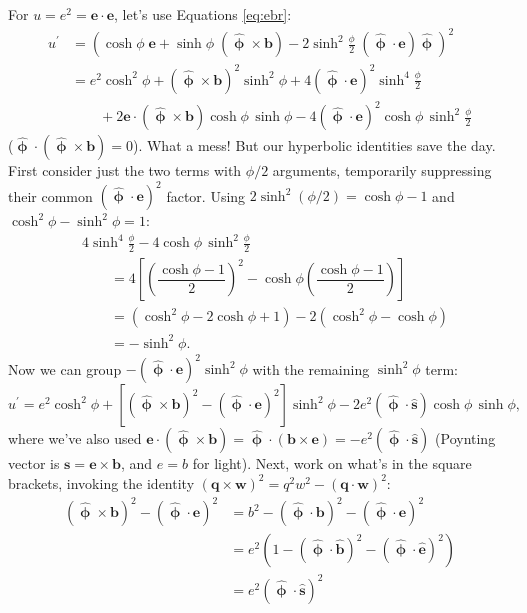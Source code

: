 \documentclass[12pt]{article}
\renewcommand{\vv}[1]{\mathbf{#1}}
\newcommand{\hatphi}{\bm{\hat{\upphi}}}
\begin{document}
For $u = e^2 = \vv e \cdot \vv e$, let's use Equations \ref{eq:ebr}:
\begin{equation*}
\begin{aligned}
u^\prime &= \left( \cosh{\phi} \; \vv e + \sinh{\phi} \; (\hatphi \times \vv b) - 2 \sinh^2 \frac{\phi}{2} \; (\hatphi \cdot \vv e) \hatphi \right)^2 \\
&= e^2 \cosh^2{\phi} + (\hatphi \times \vv b)^2 \sinh^2{\phi} + 4(\hatphi \cdot \vv e)^2 \sinh^4{\frac{\phi}{2}} \\
& \qquad + 2 \vv e \cdot (\hatphi \times \vv b) \cosh{\phi} \, \sinh{\phi} - 4 (\hatphi \cdot \vv e)^2 \cosh{\phi} \,\sinh^2{\frac{\phi}{2}}
\end{aligned}
\end{equation*}
($\hatphi \cdot (\hatphi \times \vv b) = 0$). What a mess! But our hyperbolic identities save the day. First consider just the two terms with $\phi / 2$ arguments, temporarily suppressing their common $(\hatphi \cdot \vv e)^2$ factor. Using $2\sinh^2(\phi/2) = \cosh \phi - 1$ and $\cosh^2 \phi - \sinh^2 \phi = 1$:
\begin{equation*}
\begin{aligned}
& 4 \sinh^4{\frac{\phi}{2}} - 4 \cosh{\phi} \,\sinh^2{\frac{\phi}{2}} \\[2pt]
& \qquad  = 4 \left[ \left( \dfrac{\cosh{\phi} - 1}{2} \right)^2 - \cosh{\phi} \left( \dfrac{\cosh{\phi} - 1}{2} \right) \right] \\[4pt]
& \qquad = \left( \cosh^2{\phi} - 2 \cosh{\phi} + 1 \right) - 2 \left( \cosh^2{\phi} - \cosh{\phi} \right) \\[3pt]
& \qquad = - \sinh^2{\phi} .
\end{aligned}
\end{equation*}
Now we can group $- (\hatphi \cdot \vv e)^2 \sinh^2{\phi}$ with the remaining $\sinh^2{\phi}$ term:
\begin{equation*}
u^\prime = e^2 \cosh^2{\phi} + \left[ (\hatphi \times \vv b)^2 - (\hatphi \cdot \vv e)^2 \right] \sinh^2{\phi} - 2 e^2 ( \hatphi \cdot \vv{\hat s}) \cosh{\phi} \, \sinh{\phi} ,
\end{equation*}
where we've also used $\vv e \cdot (\hatphi \times \vv b) = \hatphi \cdot (\vv b \times \vv e) = - e^2 (\hatphi \cdot \vv{\hat s})$ (Poynting vector is $\vv s = \vv e \times \vv b$, and $e = b$ for light). Next, work on what's in the square brackets, invoking the identity $(\vv q \times \vv w)^2 = q^2 w^2 - (\vv q \cdot \vv w)^2$:
\begin{equation*}
\begin{aligned}
(\hatphi \times \vv b)^2 - (\hatphi \cdot \vv e)^2 &= b^2 - (\hatphi \cdot \vv b)^2 - (\hatphi \cdot \vv e)^2 \\
&= e^2 \left( 1 - (\hatphi \cdot \vv{\hat b})^2 - (\hatphi \cdot \vv{\hat e})^2 \right) \\
&= e^2 ( \hatphi \cdot \vv{\hat s} )^2
\end{aligned}
\end{equation*}
\end{document}
